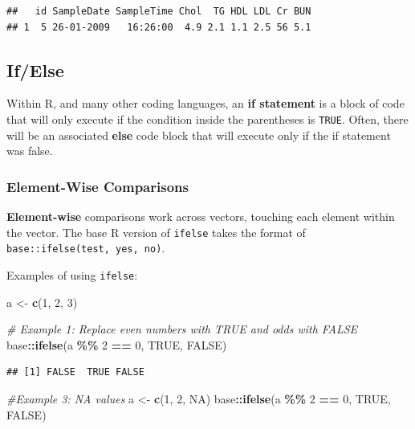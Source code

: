 \documentclass[
]{book}
\newenvironment{Shaded}{\begin{snugshade}}{\end{snugshade}}
\newcommand{\CommentTok}[1]{\textcolor[rgb]{0.56,0.35,0.01}{\textit{#1}}}
\newcommand{\ConstantTok}[1]{\textcolor[rgb]{0.56,0.35,0.01}{#1}}
\newcommand{\DecValTok}[1]{\textcolor[rgb]{0.00,0.00,0.81}{#1}}
\newcommand{\FunctionTok}[1]{\textcolor[rgb]{0.13,0.29,0.53}{\textbf{#1}}}
\newcommand{\NormalTok}[1]{#1}
\newcommand{\OtherTok}[1]{\textcolor[rgb]{0.56,0.35,0.01}{#1}}
\newcommand{\SpecialCharTok}[1]{\textcolor[rgb]{0.81,0.36,0.00}{\textbf{#1}}}
\begin{document}
\begin{verbatim}
##   id SampleDate SampleTime Chol  TG HDL LDL Cr BUN
## 1  5 26-01-2009   16:26:00  4.9 2.1 1.1 2.5 56 5.1
\end{verbatim}

\subsection{If/Else}\label{sec:ifElse}

Within R, and many other coding languages, an \textbf{if statement} is a block of code that will only execute if the condition inside the parentheses is \texttt{TRUE}. Often, there will be an associated \textbf{else} code block that will execute only if the if statement was false.

\subsubsection{Element-Wise Comparisons}\label{sec:if_else}

\textbf{Element-wise} comparisons work across vectors, touching each element within the vector. The base R version of \texttt{ifelse} takes the format of \texttt{base::ifelse(test,\ yes,\ no)}.

Examples of using \texttt{ifelse}:

\begin{Shaded}
\begin{Highlighting}[]
\NormalTok{a }\OtherTok{\textless{}{-}} \FunctionTok{c}\NormalTok{(}\DecValTok{1}\NormalTok{, }\DecValTok{2}\NormalTok{, }\DecValTok{3}\NormalTok{)}

\CommentTok{\# Example 1: Replace even numbers with TRUE and odds with FALSE}
\NormalTok{base}\SpecialCharTok{::}\FunctionTok{ifelse}\NormalTok{(a }\SpecialCharTok{\%\%} \DecValTok{2} \SpecialCharTok{==} \DecValTok{0}\NormalTok{, }\ConstantTok{TRUE}\NormalTok{, }\ConstantTok{FALSE}\NormalTok{)}
\end{Highlighting}
\end{Shaded}

\begin{verbatim}
## [1] FALSE  TRUE FALSE
\end{verbatim}

\begin{Shaded}
\begin{Highlighting}[]
\CommentTok{\#Example 3: NA values}
\NormalTok{a }\OtherTok{\textless{}{-}} \FunctionTok{c}\NormalTok{(}\DecValTok{1}\NormalTok{, }\DecValTok{2}\NormalTok{, }\ConstantTok{NA}\NormalTok{)}
\NormalTok{base}\SpecialCharTok{::}\FunctionTok{ifelse}\NormalTok{(a }\SpecialCharTok{\%\%} \DecValTok{2} \SpecialCharTok{==} \DecValTok{0}\NormalTok{, }\ConstantTok{TRUE}\NormalTok{, }\ConstantTok{FALSE}\NormalTok{)}
\end{Highlighting}
\end{Shaded}
\end{document}
